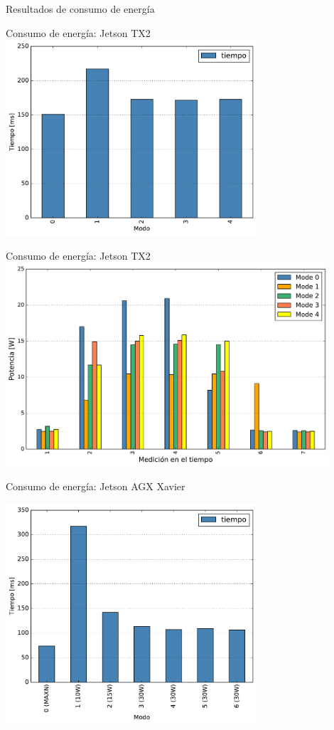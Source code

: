 
\begin{frame}
\centering
\huge
Resultados de consumo de energía
    
\end{frame}


\begin{frame}{Consumo de energía: Jetson TX2}
\centering
\includegraphics[width=0.7\textwidth]{barplot/modes-ttx2.pdf}
\end{frame}

\begin{frame}{Consumo de energía: Jetson TX2}
\centering
\includegraphics[width=0.9\textwidth]{barplot/power-tx2.pdf}
\end{frame}



\begin{frame}{Consumo de energía: Jetson AGX Xavier}

\centering
\includegraphics[width=0.7\textwidth]{barplot/modes-txavier.pdf}

\end{frame}

